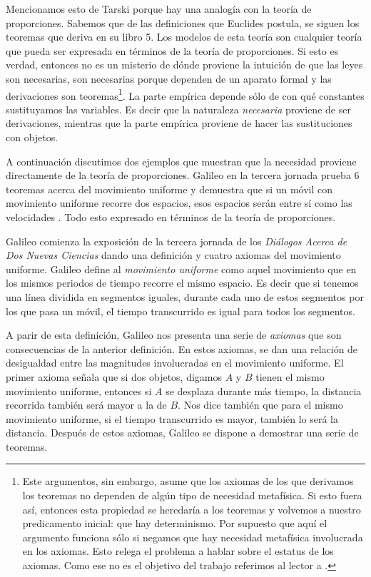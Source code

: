 Mencionamos esto de Tarski porque hay una analogía con la teoría de proporciones. Sabemos que de las definiciones que Euclides postula, se siguen los teoremas que deriva en su libro 5. Los modelos de esta teoría son cualquier teoría que pueda ser expresada en términos de la teoría de proporciones. Si esto es verdad, entonces no es un misterio de dónde proviene la intuición de que las leyes son necesarias, son necesarias porque dependen de un aparato formal y las derivaciones son teoremas\footnote{Este argumentos, sin embargo, asume que los axiomas de los que derivamos los teoremas no dependen de algún tipo de necesidad metafísica. Si esto fuera así, entonces esta propiedad se heredaría a los teoremas y volvemos a nuestro predicamento inicial: que hay determinismo. Por supuesto que aquí el argumento funciona sólo si negamos que hay necesidad metafísica involucrada en los axiomas. Esto relega el problema a hablar sobre el estatus de los axiomas. Como ese no es el objetivo del trabajo referimos al lector a \cite{Linnebo2017}.}. La parte empírica depende sólo de con qué constantes sustituyamos las variables. Es decir que la naturaleza \emph{necesaria} proviene de ser derivaciones, mientras que la parte empírica proviene de hacer las sustituciones con objetos.

A continuación discutimos dos ejemplos que muestran que la necesidad proviene directamente de la teoría de proporciones. Galileo en la tercera jornada prueba 6 teoremas acerca del movimiento uniforme y demuestra que si un móvil con movimiento uniforme recorre dos espacios, esos espacios serán entre sí como las velocidades \cite[p. 215]{galtre}. Todo esto expresado en términos de la teoría de proporciones.

Galileo comienza la exposición de la tercera jornada de los \emph{Diálogos Acerca de Dos Nuevas Ciencias} dando una definición y cuatro axiomas del movimiento uniforme. Galileo define al \textit{movimiento uniforme} como aquel movimiento que en los mismos periodos de tiempo recorre el mismo espacio. Es decir que si tenemos una línea dividida en segmentos iguales, durante cada uno de estos segmentos por los que pasa un móvil, el tiempo transcurrido es igual para todos los segmentos.

A parir de esta definición, Galileo nos presenta una serie de \textit{axiomas} que son consecuencias de la anterior definición. En estos axiomas, se dan una relación de desigualdad entre las magnitudes involucradas en el movimiento uniforme. El primer axioma señala que si dos objetos, digamos $A$ y $B$ tienen el mismo movimiento uniforme, entonces si $A$ se desplaza durante más tiempo, la distancia recorrida también será mayor a la de $B$. Nos dice también que para el mismo movimiento uniforme, si el tiempo transcurrido es mayor, también lo será la distancia. Después de estos axiomas, Galileo se dispone a demostrar una serie de teoremas.


